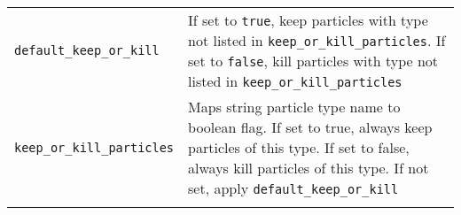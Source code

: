 \begin{table*}
\begin{center}
\begin{tabularx}{\textwidth}{lX}
\verb|default_keep_or_kill| & If set to \verb|true|, keep particles with type not listed in \verb|keep_or_kill_particles|. If set to \verb|false|, kill particles with type not listed in \verb|keep_or_kill_particles|\\
\verb|keep_or_kill_particles| & Maps string particle type name to boolean flag. If set to true, always keep particles of this type. If set to false, always kill particles of this type. If not set, apply \verb|default_keep_or_kill|\\
\begin{makeimage} %
\end{makeimage} 
\end{tabularx}
\end{center}
\end{table*}

